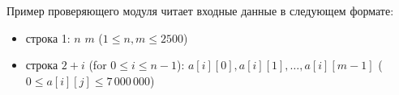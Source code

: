 Пример проверяющего модуля читает входные данные в следующем формате:
\begin{itemize}
\item строка 1:  $n$ $m$ ($1 \leq n, m \leq  2500$)
\item строка $2+i$ (for $0 \leq i \leq n-1$):  $a[i][0], a[i][1], \ldots, a[i][m-1]$ ($0 \leq a[i][j] \leq 7\,000\,000$)
\end{itemize}